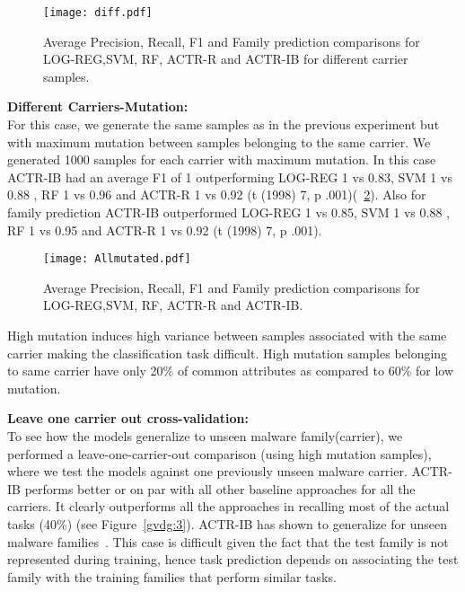 \documentclass[conference]{IEEEtran}
\begin{document}
\begin{figure}[htb!]
	\centerline{\texttt{[image: diff.pdf]}}
	\vspace{0em}
	\caption{\textmd{Average Precision, Recall, F1 and Family prediction comparisons for LOG-REG,SVM, RF, ACTR-R and ACTR-IB for different carrier samples.}}
	\vspace{-1em}
	\label{gvdg:1}
\end{figure}


\noindent
{\bf Different Carriers-Mutation:}\\
For this case, we generate the same samples as in the previous experiment but with maximum mutation between samples belonging to the same carrier. We generated 1000 samples for each carrier with maximum mutation. In this case ACTR-IB had an average F1 of 1 outperforming LOG-REG 1 vs 0.83, SVM 1 vs 0.88  , RF 1 vs 0.96 and ACTR-R 1 vs 0.92 (t (1998)  7, p  .001)(\figurename~\ref{gvdg:2}). Also for family prediction ACTR-IB outperformed LOG-REG 1 vs 0.85, SVM 1 vs 0.88  , RF 1 vs 0.95 and ACTR-R 1 vs 0.92 (t (1998)  7, p  .001). 

\begin{figure}[htb!]
	\centerline{\texttt{[image: Allmutated.pdf]}}
	\vspace{0em}
	\caption{\textmd{Average Precision, Recall, F1 and Family prediction comparisons for LOG-REG,SVM, RF, ACTR-R and ACTR-IB.}}
	\vspace{-2em}
	\label{gvdg:2}
\end{figure}

High mutation induces high variance between samples associated with the same carrier making the classification task difficult. High mutation samples belonging to same carrier have only 20\% of common attributes as compared to 60\% for low mutation.

\noindent
{\bf Leave one carrier out cross-validation:}\\
To see how the models generalize to unseen malware family(carrier), we performed a leave-one-carrier-out comparison (using high mutation samples), where we test the models against one previously unseen malware carrier.  ACTR-IB performs better or on par with all other baseline approaches for all the carriers.  It clearly outperforms all the approaches in recalling most of the actual tasks (40\%) (see Figure~\ref{gvdg:3}). ACTR-IB has shown to generalize for unseen malware families~\cite{iccm:2015}. This case is difficult given the fact that the test family is not represented during training, hence task prediction depends on associating the test family with the training families that perform similar tasks. 
\end{document}
